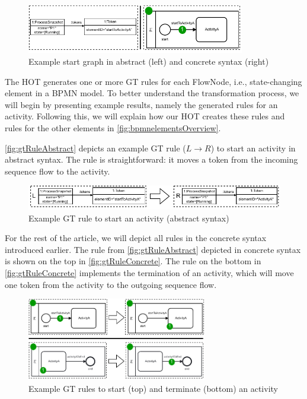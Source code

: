 \documentclass{lmcs} %
\begin{document}
\begin{figure}[ht]
    \centering
    \includegraphics[width=0.85\textwidth]{images/startGraph.pdf}
    \caption{Example start graph in abstract (left) and concrete syntax (right)}
    \label{fig:startGraph}
\end{figure}


The HOT generates one or more GT rules for each \textsf{FlowNode}, i.e., state-changing element in a BPMN model.
To better understand the transformation process, we will begin by presenting example results, namely the generated rules for an activity.
Following this, we will explain how our HOT creates these rules and rules for the other elements in \autoref{fig:bpmnelementsOverview}.

\autoref{fig:gtRuleAbstract} depicts an example GT rule ($L \to R$) to start an activity in abstract syntax.
The rule is straightforward: it moves a token from the incoming sequence flow to the activity.

\begin{figure}[ht]
    \centering
  \includegraphics[width=1\textwidth]{images/rule_abstract.pdf}
  \caption{Example GT rule to start an activity (abstract syntax)}  \label{fig:gtRuleAbstract}
\end{figure}

For the rest of the article, we will depict all rules in the concrete syntax introduced earlier.
The rule from \autoref{fig:gtRuleAbstract} depicted in concrete syntax is shown on the top in \autoref{fig:gtRuleConcrete}.
The rule on the bottom in \autoref{fig:gtRuleConcrete} implements the termination of an activity, which will move one token from the activity to the outgoing sequence flow.

\begin{figure}[ht]
    \centering
  \includegraphics[width=0.7\textwidth]{images/rule_concrete.pdf}
  \caption{Example GT rules to start (top) and terminate (bottom) an activity}
  \label{fig:gtRuleConcrete}
\end{figure}
\end{document}
